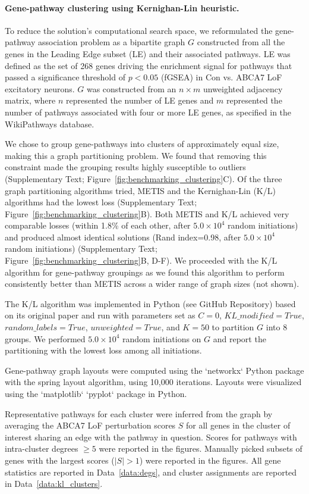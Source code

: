 \paragraph{Gene-pathway clustering using Kernighan-Lin heuristic.}
To reduce the solution's computational search space, we reformulated the gene-pathway association problem as a bipartite graph $G$ constructed from all the genes in the Leading Edge subset (LE) and their associated pathways. LE was defined as the set of 268 genes driving the enrichment signal for pathways that passed a significance threshold of $p < 0.05$ (fGSEA) in Con vs. ABCA7 LoF excitatory neurons. $G$ was constructed from an $n \times m$ unweighted adjacency matrix, where $n$ represented the number of LE genes and $m$ represented the number of pathways associated with four or more LE genes, as specified in the WikiPathways database.

We chose to group gene-pathways into clusters of approximately equal size, making this a graph partitioning problem. We found that removing this constraint made the grouping results highly susceptible to outliers (Supplementary Text; Figure~\ref{fig:benchmarking_clustering}C). Of the three graph partitioning algorithms tried, METIS and the Kernighan-Lin (K/L) algorithms had the lowest loss (Supplementary Text; Figure~\ref{fig:benchmarking_clustering}B). Both METIS and K/L achieved very comparable losses (within 1.8\% of each other, after $5.0 \times 10^4$ random initiations) and produced almost identical solutions (Rand index=0.98, after $5.0 \times 10^4$ random initiations) (Supplementary Text; Figure~\ref{fig:benchmarking_clustering}B, D-F). We proceeded with the K/L algorithm for gene-pathway groupings as we found this algorithm to perform consistently better than METIS across a wider range of graph sizes (not shown).

The K/L algorithm was implemented in Python (see GitHub Repository) based on its original paper \cite{Kernighan1970-rg} and run with parameters set as $C=0$, $KL\_modified=True$, $random\_labels=True$, $unweighted=True$, and $K=50$ to partition $G$ into 8 groups. We performed $5.0 \times 10^4$ random initiations on $G$ and report the partitioning with the lowest loss among all initiations.

Gene-pathway graph layouts were computed using the `networkx` Python package with the spring layout algorithm, using 10,000 iterations. Layouts were visualized using the `matplotlib` `pyplot` package in Python. 

Representative pathways for each cluster were inferred from the graph by averaging the ABCA7 LoF perturbation scores $S$ for all genes in the cluster of interest sharing an edge with the pathway in question. Scores for pathways with intra-cluster degrees $\geq 5$ were reported in the figures. Manually picked subsets of genes with the largest scores ($|S| > 1$) were reported in the figures. All gene statistics are reported in Data~\ref{data:degs}, and cluster assignments are reported in Data~\ref{data:kl_clusters}.

